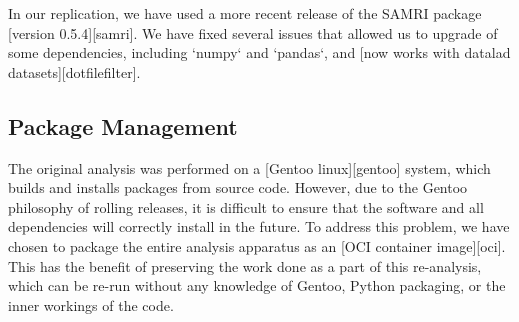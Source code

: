 In our replication, we have used a more recent release of the SAMRI package [version 0.5.4][samri]. We have fixed several issues that allowed us to upgrade of some dependencies, including `numpy` and `pandas`, and [now works with datalad datasets][dotfilefilter].


\subsection{Package Management}

The original analysis was performed on a [Gentoo linux][gentoo] system,
which builds and installs packages from source code. However, due to the 
Gentoo philosophy of rolling releases, it is difficult to ensure that
the software and all dependencies will correctly install in the future.
To address this problem, we have chosen to package the entire analysis
apparatus as an [OCI container image][oci]. This has the benefit of
preserving the work done as a part of this re-analysis, which can be
re-run without any knowledge of Gentoo, Python packaging, or the inner
workings of the code.

